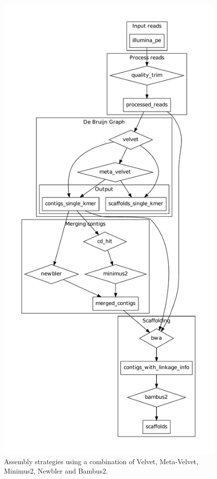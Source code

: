 \documentclass[a4paper,12pt]{article}
\begin{document}
\clearpage
\thispagestyle{empty}
\begin{figure}[ht!]
  \centering
    \includegraphics[height=\textheight]{figures/metassemble-flowchart.pdf}
  \caption{Assembly strategies using a combination of Velvet, Meta-Velvet, Minimus2, Newbler and Bambus2.}
  \label{fig:asmstrat}
\end{figure}
\end{document}
